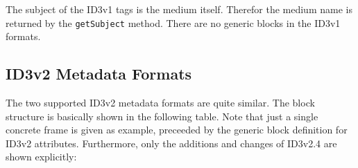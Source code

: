 The subject of the ID3v1 tags is the medium itself. Therefor the medium name is returned by the \texttt{getSubject} method. There are no generic blocks in the ID3v1 formats.


\subsection{ID3v2 Metadata Formats}
\label{sec:ID3v2}

The two supported ID3v2 metadata formats are quite similar. The block structure is basically shown in the following table. Note that just a single concrete frame is given as example, preceeded by the generic block definition for ID3v2 attributes. Furthermore, only the additions and changes of ID3v2.4 are shown explicitly:

